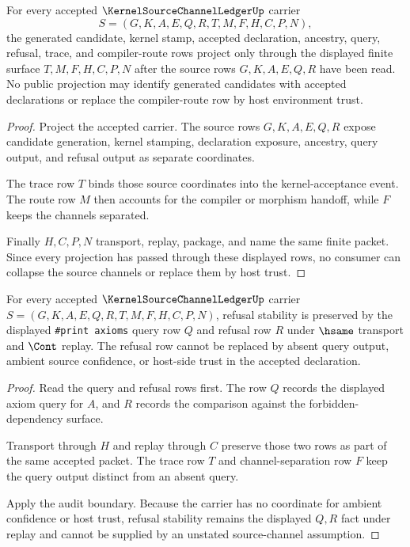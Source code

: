 \begin{theorem}
\label{thm:kernel-source-channel-ledger-trace-projection}
For every accepted $\KernelSourceChannelLedgerUp$ carrier
$$
S=(G,K,A,E,Q,R,T,M,F,H,C,P,N),
$$
the generated candidate, kernel stamp, accepted declaration, ancestry, query, refusal, trace, and compiler-route rows project only through the displayed finite surface $T,M,F,H,C,P,N$ after the source rows $G,K,A,E,Q,R$ have been read. No public projection may identify generated candidates with accepted declarations or replace the compiler-route row by host environment trust.
\end{theorem}
\begin{proof}
Project the accepted carrier. The source rows $G,K,A,E,Q,R$ expose candidate generation, kernel stamping, declaration exposure, ancestry, query output, and refusal output as separate coordinates.

The trace row $T$ binds those source coordinates into the kernel-acceptance event. The route row $M$ then accounts for the compiler or morphism handoff, while $F$ keeps the channels separated.

Finally $H,C,P,N$ transport, replay, package, and name the same finite packet. Since every projection has passed through these displayed rows, no consumer can collapse the source channels or replace them by host trust.
\end{proof}

\begin{theorem}
\label{thm:kernel-source-channel-ledger-query-refusal-stability}
For every accepted $\KernelSourceChannelLedgerUp$ carrier $S=(G,K,A,E,Q,R,T,M,F,H,C,P,N)$, refusal stability is preserved by the displayed \texttt{\#print axioms} query row $Q$ and refusal row $R$ under $\hsame$ transport and $\Cont$ replay. The refusal row cannot be replaced by absent query output, ambient source confidence, or host-side trust in the accepted declaration.
\end{theorem}
\begin{proof}
Read the query and refusal rows first. The row $Q$ records the displayed axiom query for $A$, and $R$ records the comparison against the forbidden-dependency surface.

Transport through $H$ and replay through $C$ preserve those two rows as part of the same accepted packet. The trace row $T$ and channel-separation row $F$ keep the query output distinct from an absent query.

Apply the audit boundary. Because the carrier has no coordinate for ambient confidence or host trust, refusal stability remains the displayed $Q,R$ fact under replay and cannot be supplied by an unstated source-channel assumption.
\end{proof}

